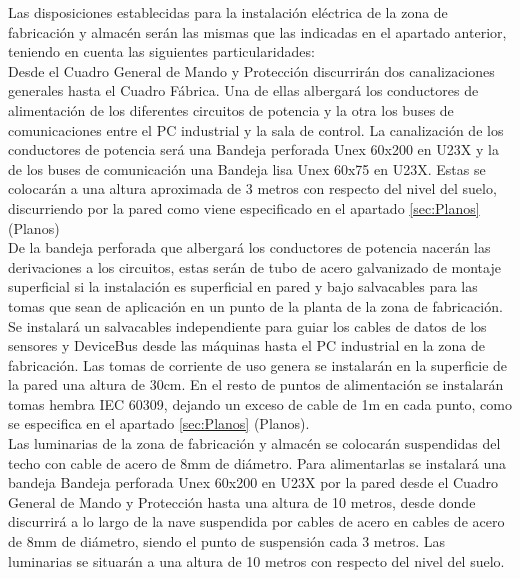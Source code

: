 Las disposiciones establecidas para la instalación eléctrica de la zona de fabricación y almacén serán las mismas que las indicadas en el apartado anterior, teniendo en cuenta las siguientes particularidades:\\

Desde el Cuadro General de Mando y Protección discurrirán dos canalizaciones generales hasta el Cuadro Fábrica. Una de ellas albergará los conductores de alimentación de los diferentes circuitos de potencia y la otra los buses de comunicaciones entre el PC industrial y la sala de control. La canalización de los conductores de potencia será una Bandeja perforada Unex 60x200 en U23X y la de los buses de comunicación una Bandeja lisa Unex 60x75 en U23X. Estas se colocarán a una altura aproximada de 3 metros con respecto del nivel del suelo, discurriendo por la pared como viene especificado en el apartado \ref{sec:Planos} (Planos)\\

De la bandeja perforada que albergará los conductores de potencia nacerán las derivaciones a los circuitos, estas serán de tubo de acero galvanizado de montaje superficial si la instalación es superficial en pared y bajo salvacables para las tomas que sean de aplicación en un punto de la planta de la zona de fabricación. Se instalará un salvacables independiente para guiar los cables de datos de los sensores y DeviceBus desde las máquinas hasta el PC industrial en la zona de fabricación. Las tomas de corriente de uso genera se instalarán en la superficie de la pared una altura de 30cm. En el resto de puntos de alimentación se instalarán tomas hembra IEC 60309, dejando un exceso de cable de 1m en cada punto, como se especifica en el apartado \ref{sec:Planos} (Planos).\\

Las luminarias de la zona de fabricación y almacén se colocarán suspendidas del techo con cable de acero de 8mm de diámetro. Para alimentarlas se instalará una bandeja Bandeja perforada Unex 60x200 en U23X por la pared desde el Cuadro General de Mando y Protección hasta una altura de 10 metros, desde donde discurrirá a lo largo de la nave suspendida por cables de acero en cables de acero de 8mm de diámetro, siendo el punto de suspensión cada 3 metros. Las luminarias se situarán a una altura de 10 metros con respecto del nivel del suelo.

\newpage


	

